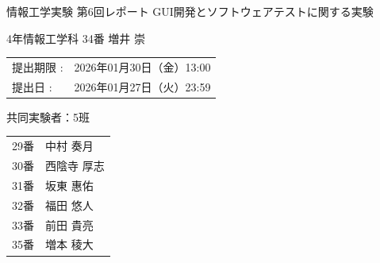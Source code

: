 \documentclass[platex,dvipdfmx,12pt]{jsarticle}
\begin{document}
\begin{titlepage}
\begin{center}
\begin{huge}
情報工学実験  第6回レポート \linebreak \vspace{1em}
GUI開発とソフトウェアテストに関する実験\end{huge}
\end{center}

\vspace{6em}

\begin{LARGE}
\begin{flushright}
4年情報工学科 34番 \linebreak \vspace{1em}
増井 崇
\end{flushright}
\end{LARGE}

\vspace{4em}

\begin{Large}
\begin{tabular}{ll}
提出期限 : & 2026年01月30日（金）13:00 \\
提出日 : & 2026年01月27日（火）23:59
\end{tabular}

\vspace{2em}

共同実験者：5班

\vspace{1em}

\begin{tabular}{ll}
29番 & 中村 奏月 \\
30番 & 西陰寺 厚志 \\
31番 & 坂東 惠佑 \\
32番 & 福田 悠人 \\
33番 & 前田 貴亮 \\
35番 & 増本 稜大 \\
\end{tabular}

\end{Large}

\end{titlepage}
\end{document}
